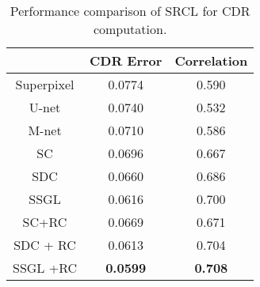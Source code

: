 \documentclass[journal]{IEEEtran}
\begin{document}
\begin{table}
  \caption{ Performance comparison of SRCL for   CDR computation.
} \begin{center}
        \begin{tabular}{c|c|c   } \hline
     & {CDR Error}  &    Correlation        
               \\\hline
         	Superpixel \cite{tmi2013} & 0.0774 & 0.590 \\ \hline
         U-net \cite{Ronneberger2015}  & 0.0740  & 0.532  \\ \hline
         M-net \cite{huazhu18} & 0.0710  &  0.586 \\ \hline
             SC \cite{sparsecoding}   & 0.0696& 0.667       \\\hline
           
                       SDC \cite{CJ15}  & 0.0660  &    0.686         \\\hline
                     SSGL \cite{Cheng:17BOE} & 0.0616 & 0.700 \\\hline
                        SC+RC & 0.0669  & 0.671    \\ \hline
                           SDC + RC  &  0.0613    &    0.704        \\\hline
                SSGL +RC & \textbf{0.0599}  & \textbf{0.708}  \\\hline
        \end{tabular}
    \end{center}
 \label{table1}
\end{table}
\end{document}

